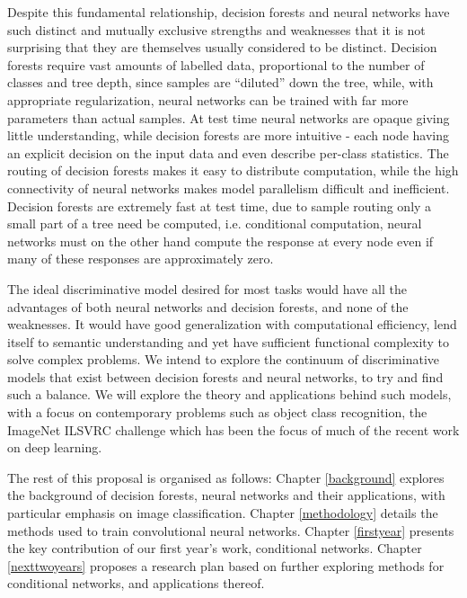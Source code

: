 \documentclass[thesis]{subfiles}
\begin{document}
Despite this fundamental relationship, decision forests and neural networks have such distinct and mutually exclusive strengths and weaknesses that it is not surprising that they are themselves usually considered to be distinct. Decision forests require vast amounts of labelled data, proportional to the number of classes and tree depth, since samples are ``diluted'' down the tree, while, with appropriate regularization, neural networks can be trained with far more parameters than actual samples. At test time neural networks are opaque giving little understanding, while decision forests are more intuitive - each node having an explicit decision on the input data and even describe per-class statistics. The routing of decision forests makes it easy to distribute computation, while the high connectivity of neural networks makes model parallelism difficult and inefficient. Decision forests are extremely fast at test time, due to sample routing only a small part of a tree need be computed, i.e. conditional computation, neural networks must on the other hand compute the response at every node even if many of these responses are approximately zero.

The ideal discriminative model desired for most tasks would have all the advantages of both neural networks and decision forests, and none of the weaknesses. It would have good generalization with computational efficiency, lend itself to semantic understanding and yet have sufficient functional complexity to solve complex problems. We intend to explore the continuum of discriminative models that exist between decision forests and neural networks, to try and find such a balance. We will explore the theory and applications behind such models, with a focus on contemporary problems such as object class recognition, \ie the ImageNet ILSVRC challenge which has been the focus of much of the recent work on deep learning.

The rest of this proposal is organised as follows: Chapter \ref{background} explores the background of decision forests, neural networks and their applications, with particular emphasis on image classification. Chapter \ref{methodology} details the methods used to train convolutional neural networks. Chapter \ref{firstyear} presents the key contribution of our first year's work, conditional networks. Chapter \ref{nexttwoyears} proposes a research plan based on further exploring methods for conditional networks, and applications thereof.

\end{document}
